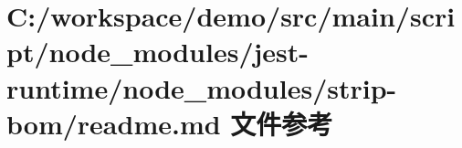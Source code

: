 \hypertarget{node__modules_2jest-runtime_2node__modules_2strip-bom_2_r_e_a_d_m_e_8md}{}\section{C\+:/workspace/demo/src/main/script/node\+\_\+modules/jest-\/runtime/node\+\_\+modules/strip-\/bom/readme.md 文件参考}
\label{node__modules_2jest-runtime_2node__modules_2strip-bom_2_r_e_a_d_m_e_8md}
